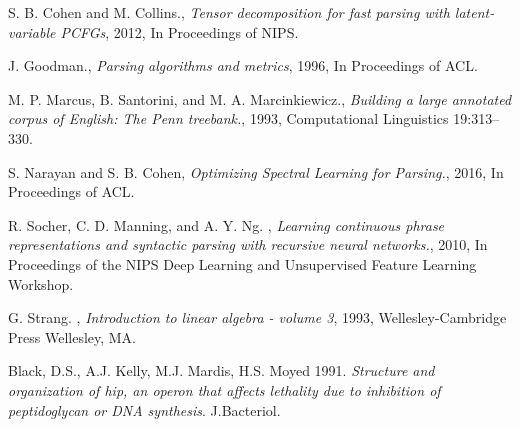 \documentclass[conference]{IEEEtran}
\begin{document}
\ifCLASSOPTIONcaptionsoff
  \newpage
\fi





%
%
%
\begin{thebibliography}{6}

S. B. Cohen and M. Collins., \emph{Tensor decomposition for fast parsing with latent-variable PCFGs}, 2012, In Proceedings of NIPS.

J. Goodman., \emph{Parsing algorithms and metrics}, 1996, In Proceedings of ACL.

M. P. Marcus, B. Santorini, and M. A. Marcinkiewicz., \emph{Building  a  large  annotated corpus of English:  The Penn treebank.}, 1993, Computational Linguistics 19:313–330.

S. Narayan and S. B. Cohen, \emph{Optimizing Spectral Learning for Parsing.}, 2016, In Proceedings of ACL.

R. Socher, C. D. Manning, and A. Y. Ng. , \emph{Learning continuous phrase representations and syntactic
parsing with recursive neural networks.}, 2010, In
Proceedings of the NIPS Deep Learning and Unsupervised Feature Learning Workshop.

G. Strang. , \emph{Introduction to linear algebra - volume 3}, 1993, Wellesley-Cambridge Press Wellesley, MA.

Black, D.S., A.J. Kelly, M.J. Mardis, H.S. Moyed 1991. \emph{Structure and organization of hip, an operon that affects lethality due to inhibition of peptidoglycan or DNA synthesis}. J.Bacteriol.
\end{thebibliography}
\end{document}

